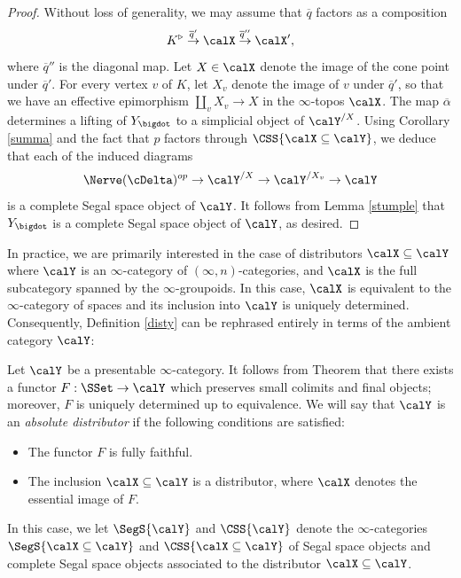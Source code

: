 \begin{proof}
Without loss of generality, we may assume that $\overline{q}$ factors as a composition
$$ K^{\triangleright} \stackrel{ \overline{q}'}{\rightarrow} \calX \stackrel{\overline{q}''}{\rightarrow} \calX',$$
where $\overline{q}''$ is the diagonal map. Let $X \in \calX$ denote the image of the cone point
under $\overline{q}'$. For every vertex $v$ of $K$, let $X_{v}$ denote the image of $v$ under
$\overline{q}'$, so that we have an effective epimorphism $\coprod_{v} X_v \rightarrow X$ in the $\infty$-topos $\calX$. The map $\overline{\alpha}$ determines a lifting of $Y_{\bigdot}$ to a simplicial object
of $\calY^{/X}$. Using Corollary \ref{summa} and the fact that $p$ factors through $\CSS{ \calX \subseteq \calY}$, we deduce that each of the induced diagrams
$$ \Nerve(\cDelta)^{op} \rightarrow \calY^{/X} \rightarrow \calY^{/X_v} \rightarrow \calY$$
is a complete Segal space object of $\calY$. It follows from Lemma \ref{stumple} that
$Y_{\bigdot}$ is a complete Segal space object of $\calY$, as desired.
\end{proof}

In practice, we are primarily interested in the case of distributors $\calX \subseteq \calY$
where $\calY$ is an $\infty$-category of $(\infty,n)$-categories, and $\calX$ is the full subcategory spanned by the $\infty$-groupoids. In this case, $\calX$ is equivalent to the $\infty$-category
of spaces and its inclusion into $\calY$ is uniquely determined. Consequently, Definition \ref{disty} can be rephrased entirely in terms of the ambient category $\calY$:

\begin{definition}\label{custo}
Let $\calY$ be a presentable $\infty$-category. It follows from Theorem  that
there exists a functor $F: \SSet \rightarrow \calY$ which preserves small colimits and final objects; moreover, $F$ is uniquely determined up to equivalence. We will say that $\calY$ is an {\it absolute distributor} if the following conditions are satisfied:
\begin{itemize}
\item[$(1)$] The functor $F$ is fully faithful.
\item[$(2)$] The inclusion $\calX \subseteq \calY$ is a distributor, where $\calX$ denotes the essential image of $F$.
\end{itemize}
In this case, we let $\SegS{ \calY }$ and $\CSS{ \calY}$ denote the $\infty$-categories
$\SegS{ \calX \subseteq \calY}$ and $\CSS{ \calX \subseteq \calY}$ of Segal space objects and
complete Segal space objects associated to the distributor $\calX \subseteq \calY$.
\end{definition}


